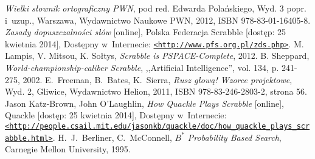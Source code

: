 \documentclass[a4paper,twocolumn,11pt]{article}
\theoremstyle{definition}
\begin{document}
\begin{thebibliography}{9}
	\small
		\emph{Wielki słownik ortograficzny PWN}, pod red. Edwarda Polańskiego, Wyd. 3 popr. i~uzup., Warszawa, Wydawnictwo Naukowe PWN, 2012, ISBN 978-83-01-16405-8.
		\emph{Zasady dopuszczalności słów} [online], Polska Federacja Scrabble [dostęp: 25 kwietnia 2014], Dostępny w~Internecie: \href{http://www.pfs.org.pl/zds.php}{\nolinkurl{<http://www.pfs.org.pl/zds.php>}}.
	 M. Lampis, V. Mitsou, K. Sołtys, \emph{Scrabble is PSPACE-Complete}, 2012.
	 B. Sheppard, \emph{World-championship-caliber Scrabble}, ,,Artificial Intelligence'', vol. 134, p. 241-275, 2002.
	 E.~Freeman, B.~Bates, K.~Sierra, \emph{Rusz głową! Wzorce projektowe}, Wyd. 2, Gliwice, Wydawnictwo Helion, 2011, ISBN 978-83-246-2803-2, strona 56.
		Jason Katz-Brown, John O'Laughlin, \emph{How Quackle Plays Scrabble} [online], Quackle [dostęp: 25 kwietnia 2014], Dostępny w~Internecie: \href{http://people.csail.mit.edu/jasonkb/quackle/doc/how_quackle_plays_scrabble.html}{\nolinkurl{<http://people.csail.mit.edu/jasonkb/quackle/doc/how\_quackle\_plays\_scrabble.html>}}.
	 H.~J.~Berliner, C.~McConnell, \emph{$B^{*}$ Probability Based Search}, Carnegie Mellon University, 1995.
\end{thebibliography}
\end{document}
